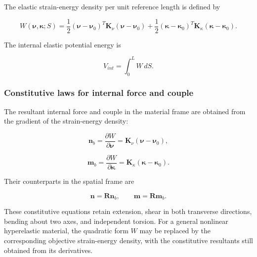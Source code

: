 The elastic strain-energy density per unit reference length is defined by

\begin{equation}
\label{eq:rod-1-33}
W\left( \bm{\nu},\bm{\kappa};S \right) = \frac{1}{2}\left( \bm{\nu} - \bm{\nu}_{0} \right)^{T}\mathbf{K}_{\nu}\left( \bm{\nu} - \bm{\nu}_{0} \right) + \frac{1}{2}\left( \bm{\kappa} - \bm{\kappa}_{0} \right)^{T}\mathbf{K}_{\kappa}\left( \bm{\kappa} - \bm{\kappa}_{0} \right).
\end{equation}

The internal elastic potential energy is

\begin{equation}
\label{eq:rod-1-34}
V_{int} = \int_{0}^{L}W\, dS.
\end{equation}

\subsubsection{Constitutive laws for internal force and couple}\label{sec:rod-1-3-4}

The resultant internal force and couple in the material frame are obtained from the gradient of the strain-energy density:

\begin{equation}
\label{eq:rod-1-35}
\mathbf{n}_{b} = \frac{\partial W}{\partial\bm{\nu}} = \mathbf{K}_{\nu}\left( \bm{\nu} - \bm{\nu}_{0} \right),
\end{equation}

\begin{equation}
\label{eq:rod-1-36}
\mathbf{m}_{b} = \frac{\partial W}{\partial\bm{\kappa}} = \mathbf{K}_{\kappa}\left( \bm{\kappa} - \bm{\kappa}_{0} \right).
\end{equation}

Their counterparts in the spatial frame are

\begin{equation}
\label{eq:rod-1-37}
\mathbf{n} = \mathbf{R}\mathbf{n}_{b},\quad\quad\mathbf{m} = \mathbf{R}\mathbf{m}_{b}.
\end{equation}

These constitutive equations retain extension, shear in both transverse directions, bending about two axes, and independent torsion. For a general nonlinear hyperelastic material, the quadratic form \(W\) may be replaced by the corresponding objective strain-energy density, with the constitutive resultants still obtained from its derivatives.

